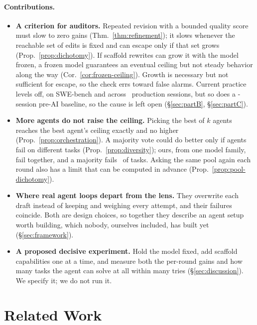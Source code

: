 \documentclass{article}
\theoremstyle{remark}
\theoremstyle{plain}
\begin{document}
\paragraph{Contributions.}
\begin{itemize}[leftmargin=*,itemsep=1pt]
    \item \textbf{A criterion for auditors.} Repeated revision with a bounded quality score must slow to zero gains (Thm.~\ref{thm:refinement}); it slows whenever the reachable set of edits is fixed and can escape only if that set grows (Prop.~\ref{prop:dichotomy}). If scaffold rewrites can grow it with the model frozen, a frozen model guarantees an eventual ceiling but not steady behavior along the way (Cor.~\ref{cor:frozen-ceiling}). Growth is necessary but not sufficient for escape, so the check errs toward false alarms. Current practice levels off, on SWE-bench and across \statPCSessions\ production sessions, but so does a \statPCCtrlSessions-session pre-AI baseline, so the cause is left open (\S\ref{sec:partB}, \S\ref{sec:partC}).
    \item \textbf{More agents do not raise the ceiling.} Picking the best of $k$ agents reaches the best agent's ceiling exactly and no higher (Prop.~\ref{prop:orchestration}). A majority vote could do better only if agents fail on different tasks (Prop.~\ref{prop:diversity}); ours, from one model family, fail together, and a majority fails \statPBOverlapViolate\ of tasks. Asking the same pool again each round also has a limit that can be computed in advance (Prop.~\ref{prop:pool-dichotomy}).
    \item \textbf{Where real agent loops depart from the lens.} They overwrite each draft instead of keeping and weighing every attempt, and their failures coincide. Both are design choices, so together they describe an agent setup worth building, which nobody, ourselves included, has built yet (\S\ref{sec:framework}).
    \item \textbf{A proposed decisive experiment.} Hold the model fixed, add scaffold capabilities one at a time, and measure both the per-round gains and how many tasks the agent can solve at all within many tries (\S\ref{sec:discussion}). We specify it; we do not run it.
\end{itemize}

\section{Related Work}
\label{sec:related}
\end{document}
